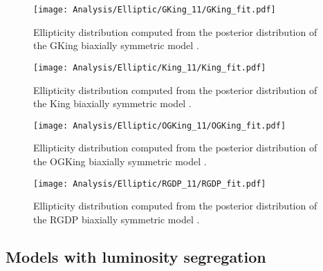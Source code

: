 \begin {figure}
 \centering
 \texttt{[image: Analysis/Elliptic/GKing\_11/GKing\_fit.pdf]}
  \caption{Ellipticity distribution computed from the posterior distribution of the GKing biaxially symmetric model .}
\label{fig:GKingEllepsilon}
\end {figure}

\begin {figure}
 \centering
 \texttt{[image: Analysis/Elliptic/King\_11/King\_fit.pdf]}
  \caption{Ellipticity distribution computed from the posterior distribution of the King biaxially symmetric model .}
\label{fig:KingEllepsilon}
\end {figure}

\begin {figure}
 \centering
 \texttt{[image: Analysis/Elliptic/OGKing\_11/OGKing\_fit.pdf]}
  \caption{Ellipticity distribution computed from the posterior distribution of the OGKing biaxially symmetric model .}
\label{fig:OGKingEllepsilon}
\end {figure}

\begin {figure}
 \centering
 \texttt{[image: Analysis/Elliptic/RGDP\_11/RGDP\_fit.pdf]}
  \caption{Ellipticity distribution computed from the posterior distribution of the RGDP biaxially symmetric model .}
\label{fig:RGDPEllepsilon}
\end {figure}

\clearpage
\subsection{Models with luminosity segregation}
\label{sect:app_segregated}

